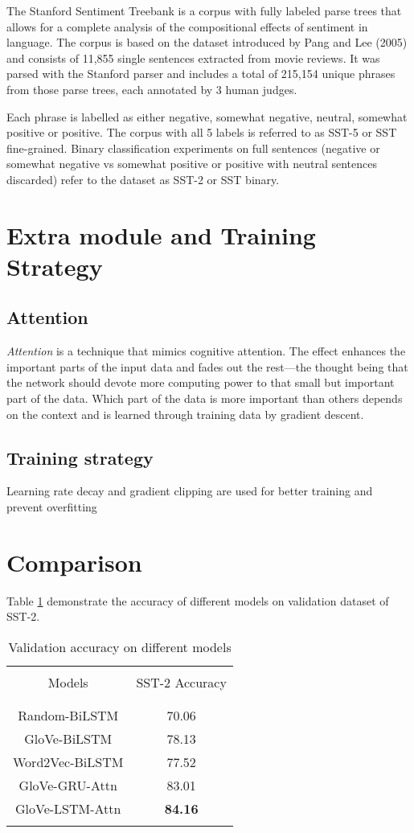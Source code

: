 \documentclass[12pt, a4paper]{article}
\begin{document}
	The Stanford Sentiment Treebank is a corpus with fully labeled parse trees that allows for a complete analysis of the compositional effects of sentiment in language. The corpus is based on the dataset introduced by Pang and Lee (2005) and consists of 11,855 single sentences extracted from movie reviews. It was parsed with the Stanford parser and includes a total of 215,154 unique phrases from those parse trees, each annotated by 3 human judges.
	
	Each phrase is labelled as either negative, somewhat negative, neutral, somewhat positive or positive. The corpus with all 5 labels is referred to as SST-5 or SST fine-grained. Binary classification experiments on full sentences (negative or somewhat negative vs somewhat positive or positive with neutral sentences discarded) refer to the dataset as SST-2 or SST binary.
	
	\section{Extra module and Training Strategy}
	\subsection{Attention}
	\textit{Attention} is a technique that mimics cognitive attention. The effect enhances the important parts of the input data and fades out the rest—the thought being that the network should devote more computing power to that small but important part of the data. Which part of the data is more important than others depends on the context and is learned through training data by gradient descent.
	\subsection{Training strategy}
	Learning rate decay and gradient clipping are used for better training and prevent overfitting
	
	\section{Comparison}
	Table \ref{table:data} demonstrate the accuracy of different models on validation dataset of SST-2.
	
	\begin{table}[h!]
		\centering
		\begin{tabular}{||c | c||} 
			\hline
			& \\
			Models & SST-2 Accuracy \\
			& \\
			\hline\hline
			& \\
			Random-BiLSTM & 70.06 \\ 
			GloVe-BiLSTM & 78.13\\
			Word2Vec-BiLSTM & 77.52 \\
			GloVe-GRU-Attn & 83.01 \\
			GloVe-LSTM-Attn & \textbf{84.16} \\
			& \\
			\hline
		\end{tabular}
		\caption{Validation accuracy on different models}
		\label{table:data}
	\end{table}
	
\end{document}
